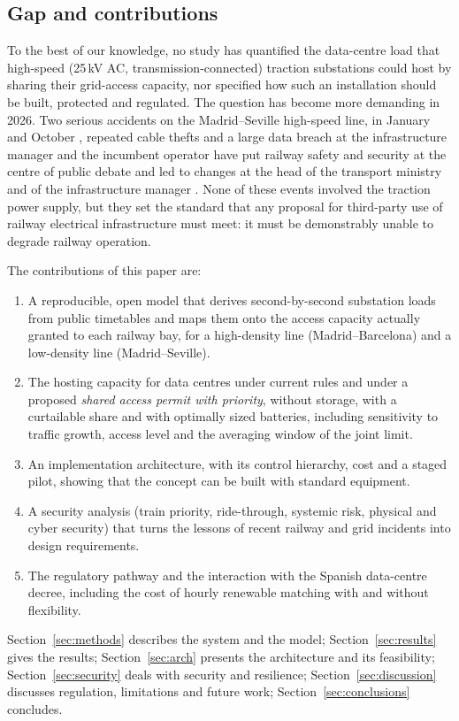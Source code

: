 \subsection{Gap and contributions}

To the best of our knowledge, no study has quantified the data-centre load that high-speed (25\,kV AC, transmission-connected) traction substations could host by sharing their grid-access capacity, nor specified how such an installation should be built, protected and regulated. The question has become more demanding in 2026. Two serious accidents on the Madrid--Seville high-speed line, in January and October \cite{adamuz2026,urda2026}, repeated cable thefts \cite{cable2026} and a large data breach at the infrastructure manager and the incumbent operator \cite{cyber2026} have put railway safety and security at the centre of public debate and led to changes at the head of the transport ministry and of the infrastructure manager \cite{infobae2026}. None of these events involved the traction power supply, but they set the standard that any proposal for third-party use of railway electrical infrastructure must meet: it must be demonstrably unable to degrade railway operation.

The contributions of this paper are:
\begin{enumerate}
\item A reproducible, open model that derives second-by-second substation loads from public timetables and maps them onto the access capacity actually granted to each railway bay, for a high-density line (Madrid--Barcelona) and a low-density line (Madrid--Seville).
\item The hosting capacity for data centres under current rules and under a proposed \emph{shared access permit with priority}, without storage, with a curtailable share and with optimally sized batteries, including sensitivity to traffic growth, access level and the averaging window of the joint limit.
\item An implementation architecture, with its control hierarchy, cost and a staged pilot, showing that the concept can be built with standard equipment.
\item A security analysis (train priority, ride-through, systemic risk, physical and cyber security) that turns the lessons of recent railway and grid incidents into design requirements.
\item The regulatory pathway and the interaction with the Spanish data-centre decree, including the cost of hourly renewable matching with and without flexibility.
\end{enumerate}

Section~\ref{sec:methods} describes the system and the model; Section~\ref{sec:results} gives the results; Section~\ref{sec:arch} presents the architecture and its feasibility; Section~\ref{sec:security} deals with security and resilience; Section~\ref{sec:discussion} discusses regulation, limitations and future work; Section~\ref{sec:conclusions} concludes.
